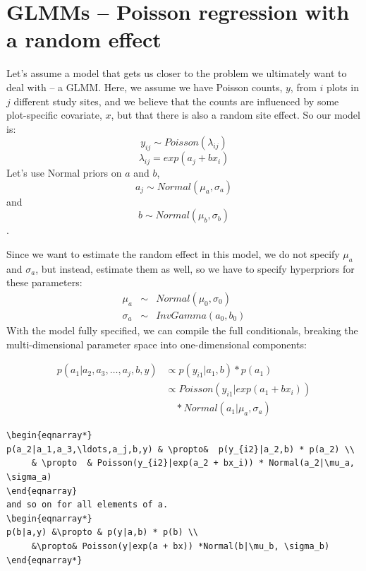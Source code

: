 \section{ GLMMs – Poisson regression with a random effect }

Let's assume a model that gets us closer to the problem we ultimately want to deal with – a GLMM. Here, we assume we have Poisson counts, $y$, from $i$ plots in $j$ different study sites, and we believe that the counts are influenced by some plot-specific covariate, $x$, but that there is also a random site effect. So our model is:
\[
y_{ij} \sim Poisson (\lambda_{ij})
\]
\[
\lambda_{ij} = exp (a_j + bx_i)
\]
Let's use Normal priors on $a$ and $b$,  \[
a_j \sim Normal (\mu_a, \sigma_a)
\]
and
\[
b \sim Normal (\mu_b, \sigma_b)
\].

Since we want to estimate the random effect in this model, we do not
specify $\mu_a$ and $\sigma_a$, but instead, estimate them as well, so we have
to specify hyperpriors for these parameters:
\begin{eqnarray*}
\mu_a  &\sim &  Normal(\mu_0, \sigma_0)  \\
\sigma_{a} & \sim & InvGamma(a_0, b_0)
\end{eqnarray*}
With the model fully specified, we can compile the full conditionals, breaking the multi-dimensional parameter space into one-dimensional components:

\begin{equation*}
\begin{split}
p(a_1|a_2,a_3,\ldots,a_j,b,y)& \propto   p(y_{i1}|a_1,b) * p(a_1) \\
	 & \propto    Poisson(y_{i1}| exp(a_1 + bx_i))\\
     & \quad * Normal(a_1|\mu_a, \sigma_a)
\end{split}
\end{equation*}

\begin{verbatim}
\begin{eqnarray*}
p(a_2|a_1,a_3,\ldots,a_j,b,y) & \propto&  p(y_{i2}|a_2,b) * p(a_2) \\
	 & \propto  & Poisson(y_{i2}|exp(a_2 + bx_i)) * Normal(a_2|\mu_a, \sigma_a)
\end{eqnarray}
and so on for all elements of a.
\begin{eqnarray*}
p(b|a,y) &\propto & p(y|a,b) * p(b) \\
	 &\propto& Poisson(y|exp(a + bx)) *Normal(b|\mu_b, \sigma_b)
\end{eqnarray*}
\end{verbatim}

